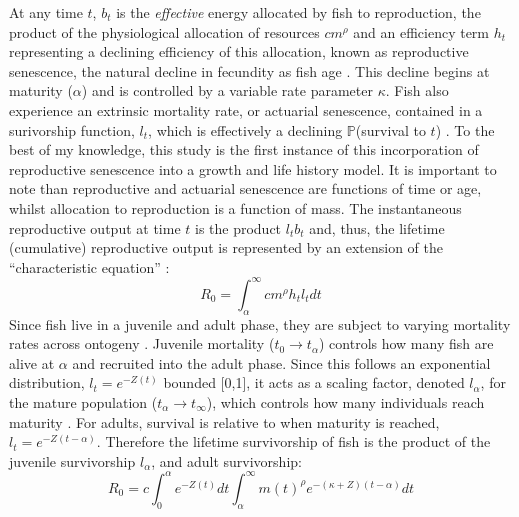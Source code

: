 \documentclass[a4paper]{article} %
\begin{document}
At any time $t$, $b_{t}$ is the \textit{effective} energy allocated by fish to reproduction, the product of the physiological allocation of resources $cm^{\rho}$ and an efficiency term $h_t$ representing a declining efficiency of this allocation, known as reproductive senescence, the natural decline in fecundity as fish age \autocite{Stearns2000, Benoit2018, Vrtilek2018}. This decline begins at maturity ($\alpha$) and is controlled by a variable rate parameter $\kappa$. Fish also experience an extrinsic mortality rate, or actuarial senescence, contained in a surivorship function, $l_t$, which is effectively a declining $\mathbb{P}$(survival to $t$) \autocite{Beverton1959, Peterson1984, Charnov1993,Walters1993, Charnov2001, Benoit2018, Laird2010, Reznick2002, Reznick2006}. To the best of my knowledge, this study is the first instance of this incorporation of reproductive senescence into a growth and life history model. It is important to note than reproductive and actuarial senescence are functions of time or age, whilst allocation to reproduction is a function of mass. The instantaneous reproductive output at time $t$ is the product $l_{t}b_{t}$ and, thus, the lifetime (cumulative) reproductive output is represented by an extension of the ``characteristic equation'' \autocite{roff1992evolution, roff2002life, stearns1992evolution, Arendt2011, Tsoukali2016}:
\begin{equation}
    R_{0} = \int_{\alpha}^{\infty}cm^{\rho}h_{t}l_t dt
\end{equation}
Since fish live in a juvenile and adult phase, they are subject to varying mortality rates across ontogeny \autocite{Charnov2001}. Juvenile mortality ($t_0 \rightarrow t_{\alpha}$) controls how many fish are alive at $\alpha$ and recruited into the adult phase. Since this follows an exponential distribution, $l_t = e^{-Z(t)}$ bounded [0,1], it acts as a scaling factor, denoted $l_{\alpha}$, for the mature population ($t_{\alpha} \rightarrow t_{\infty}$), which controls how many individuals reach maturity \autocite{Charnov1990-agematurity}. For adults, survival is relative to when maturity is reached, $l_{t} = e^{-Z(t-\alpha)}$. Therefore the lifetime survivorship of fish is the product of the juvenile survivorship $l_{\alpha}$, and adult survivorship: 
\begin{equation}
    R_{0} = c\int_{0}^{\alpha}e^{-Z(t)}dt\int_{\alpha}^{\infty} m(t)^{\rho} e^{-(\kappa+Z)(t-\alpha)} dt \label{LHT_optimisation}
\end{equation}
\end{document}
